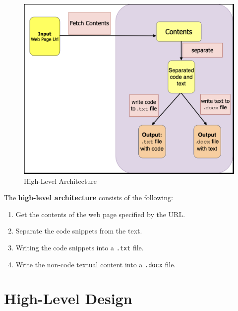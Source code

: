 \documentclass{scrreprt}
\begin{document}
\begin{figure}[h]
    \centering
    \includegraphics[width=1.0\textwidth]{figures/new-high-arch.png}
    \caption{High-Level Architecture}
    \label{fig:high-level-arch}
\end{figure}


The \textbf{high-level architecture} consists of the following:
\begin{enumerate}
    \item Get the contents of the web page specified by the URL.
    \item Separate the code snippets from the text.
    \item Writing the code snippets into a \texttt{.txt} file.
    \item Write the non-code textual content into a \texttt{.docx} file.
\end{enumerate}



\section{High-Level Design}
\end{document}
